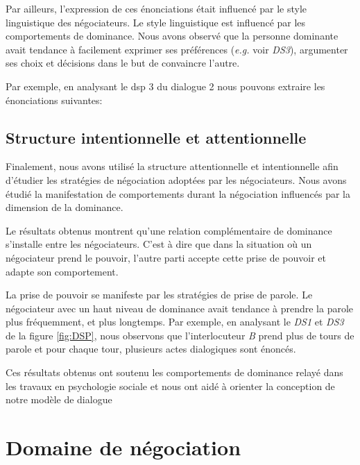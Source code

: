 				 Par ailleurs, l'expression de ces énonciations était influencé par le style linguistique des négociateurs.  Le style linguistique est influencé par les comportements de dominance. Nous avons observé que la personne dominante avait tendance à facilement exprimer ses préférences (\emph{e.g.} voir \emph{DS3}), argumenter ses choix et décisions dans le but de convaincre l'autre.  
				 
				 
				  Par exemple, en analysant le dsp 3 du dialogue 2 nous pouvons extraire les énonciations suivantes: 
				 
			\subsection{Structure intentionnelle et attentionnelle}	  
				 
				 Finalement, nous avons utilisé la structure attentionnelle et intentionnelle afin d'étudier les stratégies de négociation adoptées par les négociateurs. Nous avons étudié la manifestation de comportements durant la négociation influencés par la dimension de la dominance.
				 
				 Le résultats obtenus montrent qu'une relation complémentaire de dominance s'installe entre les négociateurs. C'est à dire que dans la situation où un négociateur prend le pouvoir, l'autre parti accepte cette prise de pouvoir et adapte son comportement.
			
				 La prise de pouvoir se manifeste par les stratégies de prise de parole. Le négociateur avec un haut niveau de dominance avait tendance à prendre la parole plus fréquemment, et plus longtemps. Par exemple, en analysant le \emph{DS1} et \emph{DS3} de la figure \ref{fig:DSP}, nous observons que l'interlocuteur \textit{B} prend plus de tours de parole et pour chaque tour, plusieurs actes dialogiques sont énoncés. 
				 
			 
			Ces résultats obtenus ont soutenu les comportements de dominance relayé dans les travaux en psychologie sociale et nous ont aidé à orienter la conception de notre modèle de dialogue
		
		
	
	\section{Domaine de négociation}
	\label{domaine}
	
	
